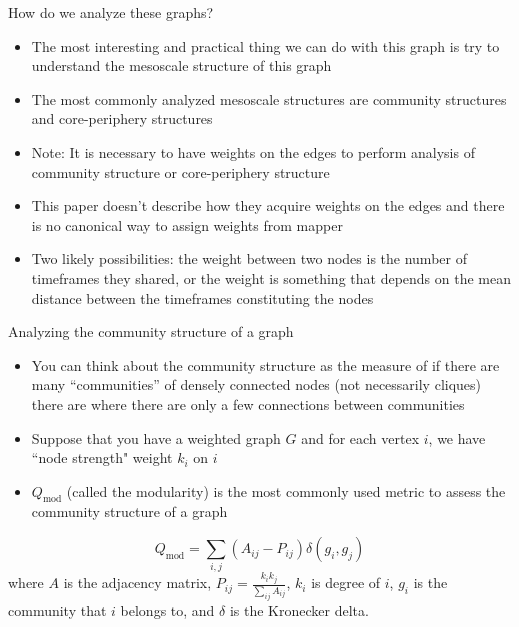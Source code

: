 \documentclass{beamer}
\begin{document}
\begin{frame}{How do we analyze these graphs?}
    \begin{itemize}
        \item The most interesting and practical thing we can do with this graph is try to understand the mesoscale structure of this graph \pause
        \item The most commonly analyzed mesoscale structures are community structures and core-periphery structures \pause
        \item Note: It is necessary to have weights on the edges to perform analysis of community structure or core-periphery structure
        \item This paper doesn't describe how they acquire weights on the edges and there is no canonical way to assign weights from mapper \pause
        \item Two likely possibilities: the weight between two nodes is the number of timeframes they shared, or the weight is something that depends on the mean distance between the timeframes constituting the nodes
    \end{itemize}
\end{frame}

\begin{frame}{Analyzing the community structure of a graph}
    \begin{itemize}
        \item You can think about the community structure as the measure of if there are many ``communities'' of densely connected nodes (not necessarily cliques) there are where there are only a few connections between communities \pause
        \item Suppose that you have a weighted graph $G$ and for each vertex $i$, we have ``node strength" weight $k_i$ on $i$ \pause
        \item $Q_{\mathrm{mod}}$ (called the modularity) is the most commonly used metric to assess the community structure of a graph\cite{community} \pause
    \end{itemize}
    \[Q_{\mathrm{mod}} = \sum_{i,j} \left(A_{ij} - P_{ij}\right)\delta(g_i, g_j)\]
    where $A$ is the adjacency matrix, $P_{ij} = \frac{k_i k_j}{\sum_{ij}A_{ij}}$, $k_i$ is degree of $i$, $g_i$ is the community that $i$ belongs to, and $\delta$ is the Kronecker delta.
\end{frame}
\end{document}
